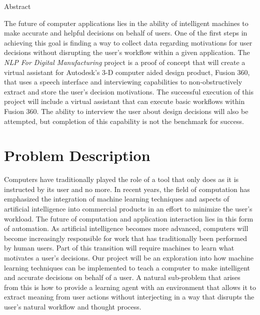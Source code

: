 \documentclass[10pt, draftclsnofoot, onecolumn]{IEEEtran}
\title{}
\author{Austin Row, Jeremy Fischer, and James Stallkamp \\
CS 461 \\
NLP for Digital Manufacturing-Problem Statement \\
Fall 2017 \\}
\date{October 2017}
\begin{document}
\maketitle

\begin{center}
Abstract \\    
\end{center}
The future of computer applications lies in the ability of intelligent machines to make accurate and helpful decisions on behalf of users. One of the first steps in achieving this goal is finding a way to collect data regarding motivations for user decisions without disrupting the user’s workflow within a given application. The \textit{NLP For Digital Manufacturing} project is a proof of concept that will create a virtual assistant for Autodesk’s 3-D computer aided design product, Fusion 360, that uses a speech interface and interviewing capabilities to non-obstructively extract and store the user’s decision motivations. The successful execution of this project will include a virtual assistant that can execute basic workflows within Fusion 360. The ability to interview the user about design decisions will also be attempted, but completion of this capability is not the benchmark for success.

\clearpage

\section*{Problem Description}
Computers have traditionally played the role of a tool that only does as it is instructed by its user and no more. In recent years, the field of computation has emphasized the integration of  machine learning techniques and aspects of artificial intelligence into commercial products in an effort to minimize the user’s workload. The future of computation and application interaction lies in this form of automation. As artificial intelligence becomes more advanced, computers will become increasingly responsible for work that has traditionally been performed by human users. Part of this transition will require machines to learn what motivates a user’s decisions. Our project will be an exploration into how machine learning techniques can be implemented to teach a computer to make intelligent and accurate decisions on behalf of a user. A natural sub-problem that arises from this is how to provide a learning agent with an environment that allows it to extract meaning from user actions without interjecting in a way that disrupts the user’s natural workflow and thought process. \\
\end{document}
